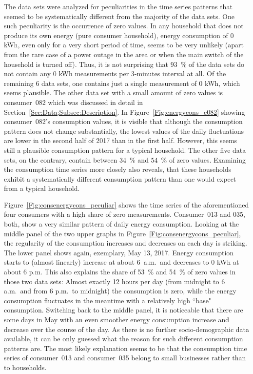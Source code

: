 The data sets were analyzed for peculiarities in the time series patterns that seemed to be systematically different from the majority of the data sets. One such peculiarity is the occurrence of zero values. In any household that does not produce its own energy (pure consumer household), energy consumption of 0 kWh, even only for a very short period of time, seems to be very unlikely (apart from the rare case of a power outage in the area or when the main switch of the household is turned off). Thus, it is not surprising that 93~\% of the data sets do not contain any 0 kWh measurements per 3-minutes interval at all. Of the remaining 6 data sets, one contains just a single measurement of 0 kWh, which seems plausible. The other data set with a small amount of zero values is consumer~082 which was discussed in detail in Section~\ref{Sec:Data;Subsec:Description}. In Figure~\ref{Fig:energycons_c082} showing consumer~082's consumption values, it is visible that although the consumption pattern does not change substantially, the lowest values of the daily fluctuations are lower in the second half of 2017 than in the first half. However, this seems still a plausible consumption pattern for a typical household. The other five data sets, on the contrary, contain between 34~\% and 54~\% of zero values. Examining the consumption time series more closely also reveals, that these households exhibit a systematically different consumption pattern than one would expect from a typical household.

Figure~\ref{Fig:consenergycons_peculiar} shows the time series of the aforementioned four consumers with a high share of zero measurements. Consumer~013 and 035, both, show a very similar pattern of daily energy consumption. Looking at the middle panel of the two upper graphs in Figure~\ref{Fig:consenergycons_peculiar}, the regularity of the consumption increases and decreases on each day is striking. The lower panel shows again, exemplary, May 13, 2017. Energy consumption starts to (almost linearly) increase at about 6~a.m.~and decreases to 0 kWh at about 6 p.m. This also explains the share of 53~\% and 54~\% of zero values in those two data sets: Almost exactly 12 hours per day (from midnight to 6 a.m.~and from 6 p.m.~to midnight) the consumption is zero, while the energy consumption fluctuates in the meantime with a relatively high ``base" consumption. Switching back to the middle panel, it is noticeable that there are some days in May with an even smoother energy consumption increase and decrease over the course of the day. As there is no further socio-demographic data available, it can be only guessed what the reason for such different consumption patterns are. The most likely explanation seems to be that the consumption time series of consumer~013 and consumer~035 belong to small businesses rather than to households.

